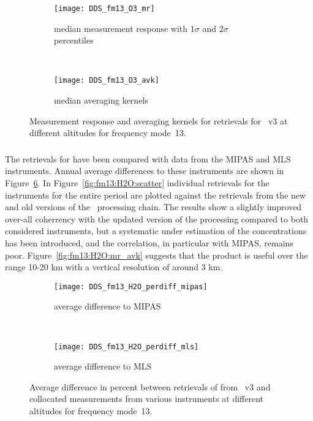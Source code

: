 \begin{figure}[htpb]
    \centering
    \begin{subfigure}[b]{0.49\textwidth}
        \texttt{[image: DDS\_fm13\_O3\_mr]}
        \caption{median measurement response with $1\sigma$ and $2\sigma$
        percentiles}
        \label{fig:fm13:O3:mr}
    \end{subfigure}
    \,
    \begin{subfigure}[b]{0.49\textwidth}
        \texttt{[image: DDS\_fm13\_O3\_avk]}
        \caption{median averaging kernels\newline~}
        \label{fig:fm13:O3:avk}
    \end{subfigure}
    \caption{Measurement response and averaging kernels for 
    retrievals for \smr~v3 at different altitudes for frequency mode~13.}
    \label{fig:fm13:O3:mr_avk}
\end{figure}



\subsubsection{}
\label{sec:fm13:comparison:H2O}
The retrievals for  have been compared with data from the MIPAS and
MLS instruments. Annual average differences to these instruments are shown in
Figure~\ref{fig:fm13:H2O:profiles}. In Figure~\ref{fig:fm13:H2O:scatter}
individual retrievals for the instruments for the entire period are plotted
against the retrievals from the new and old versions of the \smr\ processing
chain. The results show a slightly improved over-all coherrency with the
updated version of the processing compared to both considered instruments, but
a systematic under estimation of the concentrations has been introduced, and
the correlation, in particular with MIPAS, remains poor.
Figure~\ref{fig:fm13:H2O:mr_avk} suggests that the product is useful over the range 10-20 km with a vertical resolution of around 3 km. 


\begin{figure}[htpb]
    \centering
    \begin{subfigure}[b]{0.49\textwidth}
        \texttt{[image: DDS\_fm13\_H2O\_perdiff\_mipas]}
        \caption{average difference to MIPAS}
        \label{fig:fm13:H2O:profiles:MIPAS}
    \end{subfigure}
    \,
    \begin{subfigure}[b]{0.49\textwidth}
        \texttt{[image: DDS\_fm13\_H2O\_perdiff\_mls]}
        \caption{average difference to MLS}
        \label{fig:fm13:H2O:profiles:MLS}
    \end{subfigure}
    \caption{Average difference in percent between retrievals of 
    from \smr~v3 and collocated measurements from various instruments at
    different altitudes for frequency mode~13.}

    \label{fig:fm13:H2O:profiles}
\end{figure}

